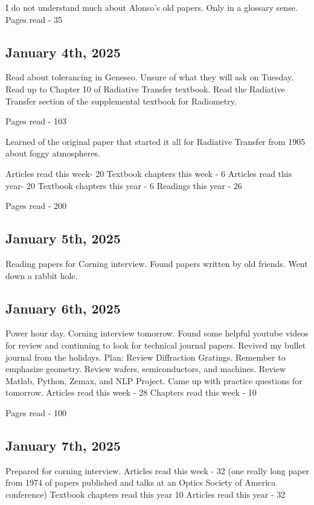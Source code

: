 \documentclass{article}
\begin{document}
I do not understand much about Alonso's old papers. Only in a glossary sense. 
Pages read - 35
\subsection{January 4th, 2025}
Read about tolerancing in Geneseo. Unsure of what they will ask on Tuesday. 
Read up to Chapter 10 of Radiative Transfer textbook. 
Read the Radiative Transfer section of the supplemental textbook for Radiometry. 

Pages read - 103

Learned of the original paper that started it all for Radiative Transfer from 1905 about foggy atmospheres.

Articles read this week- 20
Textbook chapters this week - 6
Articles read this year- 20
Textbook chapters this year - 6
Readings this year - 26

Pages read - 200 %

\subsection{January 5th, 2025}
Reading papers for Corning interview. Found papers written by old friends. Went down a rabbit hole. 


\subsection{January 6th, 2025}
Power hour day. Corning interview tomorrow. Found some helpful youtube videos for review and continuing to look for technical journal papers. Revived my bullet journal from the holidays. 
Plan: 
Review Diffraction Gratings. Remember to emphasize geometry. 
Review wafers, semiconductors, and machines. 
Review Matlab, Python, Zemax, and NLP Project. Came up with practice questions for tomorrow. 
Articles read this week - 28
Chapters read this week - 10

Pages read - 100 %

\subsection{January 7th, 2025}
Prepared for corning interview. 
Articles read this week - 32 (one really long paper from 1974 of papers published and talks at an Optics Society of America conference)
Textbook chapters read this year 10 
Articles read this year - 32
\end{document}

